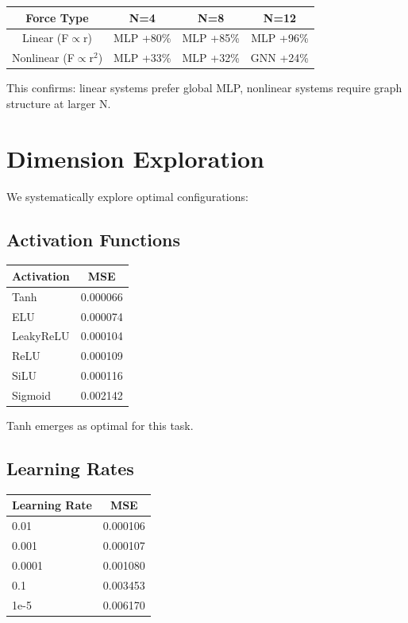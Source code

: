 \documentclass{article}
\begin{document}
\begin{center}
\begin{tabular}{c|c|c|c}
Force Type & N=4 & N=8 & N=12 \\
\hline
Linear (F$\propto$r) & MLP +80\% & MLP +85\% & MLP +96\% \\
Nonlinear (F$\propto$r$^2$) & MLP +33\% & MLP +32\% & GNN +24\% \\
\end{tabular}
\end{center}

This confirms: linear systems prefer global MLP, nonlinear systems require graph structure at larger N.

\section{Dimension Exploration}

We systematically explore optimal configurations:

\subsection{Activation Functions}
\begin{center}
\begin{tabular}{l|c}
Activation & MSE \\
\hline
Tanh & 0.000066 \\
ELU & 0.000074 \\
LeakyReLU & 0.000104 \\
ReLU & 0.000109 \\
SiLU & 0.000116 \\
Sigmoid & 0.002142 \\
\end{tabular}
\end{center}

Tanh emerges as optimal for this task.

\subsection{Learning Rates}
\begin{center}
\begin{tabular}{l|c}
Learning Rate & MSE \\
\hline
0.01 & 0.000106 \\
0.001 & 0.000107 \\
0.0001 & 0.001080 \\
0.1 & 0.003453 \\
1e-5 & 0.006170 \\
\end{tabular}
\end{center}
\end{document}
